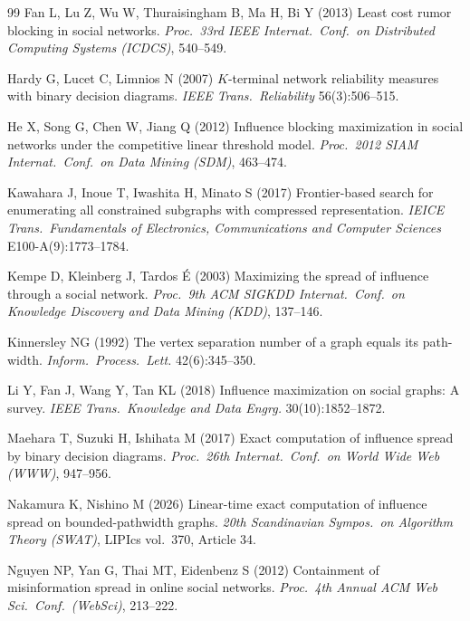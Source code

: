 \documentclass[11pt]{article}
\theoremstyle{definition}
\theoremstyle{remark}
\begin{document}
\begin{thebibliography}{99}
Fan L, Lu Z, Wu W, Thuraisingham B, Ma H, Bi Y (2013) Least cost rumor
  blocking in social networks. \emph{Proc.\ 33rd IEEE Internat.\ Conf.\ on
  Distributed Computing Systems (ICDCS)}, 540--549.

Hardy G, Lucet C, Limnios N (2007) $K$-terminal network reliability measures
  with binary decision diagrams. \emph{IEEE Trans.\ Reliability}
  56(3):506--515.

He X, Song G, Chen W, Jiang Q (2012) Influence blocking maximization in
  social networks under the competitive linear threshold model.
  \emph{Proc.\ 2012 SIAM Internat.\ Conf.\ on Data Mining (SDM)}, 463--474.

Kawahara J, Inoue T, Iwashita H, Minato S (2017) Frontier-based search for
  enumerating all constrained subgraphs with compressed representation.
  \emph{IEICE Trans.\ Fundamentals of Electronics, Communications and Computer
  Sciences} E100-A(9):1773--1784.

Kempe D, Kleinberg J, Tardos {\'E} (2003) Maximizing the spread of influence
  through a social network. \emph{Proc.\ 9th ACM SIGKDD Internat.\ Conf.\ on
  Knowledge Discovery and Data Mining (KDD)}, 137--146.

Kinnersley NG (1992) The vertex separation number of a graph equals its
  path-width. \emph{Inform.\ Process.\ Lett.} 42(6):345--350.

Li Y, Fan J, Wang Y, Tan KL (2018) Influence maximization on social graphs: A
  survey. \emph{IEEE Trans.\ Knowledge and Data Engrg.} 30(10):1852--1872.

Maehara T, Suzuki H, Ishihata M (2017) Exact computation of influence
  spread by binary decision diagrams. \emph{Proc.\ 26th Internat.\ Conf.\
  on World Wide Web (WWW)}, 947--956.

Nakamura K, Nishino M (2026) Linear-time exact computation of influence
  spread on bounded-pathwidth graphs. \emph{20th Scandinavian Sympos.\ on
  Algorithm Theory (SWAT)}, LIPIcs vol.\ 370, Article 34.

Nguyen NP, Yan G, Thai MT, Eidenbenz S (2012) Containment of misinformation
  spread in online social networks. \emph{Proc.\ 4th Annual ACM Web Sci.\
  Conf.\ (WebSci)}, 213--222.


\end{thebibliography}
\end{document}
